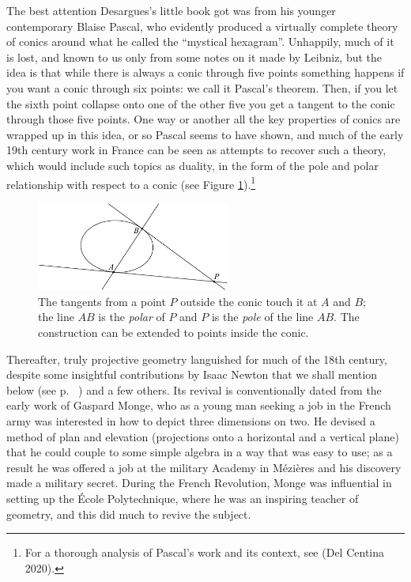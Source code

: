 The best attention Desargues's little book got was from his younger contemporary Blaise Pascal, who evidently produced a virtually complete theory of conics around what he called the ``mystical hexagram''. Unhappily, much of it is lost, and known to us only from some notes on it made by Leibniz, but the idea is that while there is always a conic through five points something happens if you want a conic through six points: we call it Pascal's theorem. Then, if you let the sixth point collapse onto one of the other five you get a tangent to the conic through those five points. One way or another all the key properties of conics are wrapped up in this idea, or so Pascal seems to have shown, and much of the early 19th century work in France can be seen as attempts to recover such a theory, which would include such topics as duality, in the form of the pole and polar relationship with respect to a conic (see Figure \ref{figpolepolar}).\footnote{For a thorough analysis of Pascal's work and its context, see (Del Centina 2020).} 



\begin{figure}
\includegraphics[width=180pt]{main/poleandpolar} 
\caption{The tangents from a point $P$ outside the conic touch it at
  $A$ and $B$; the line $AB$ is the \emph{polar} of $P$ and $P$ is the
  \emph{pole} of the line $AB$. The construction can be extended to
  points inside the conic.} 
      \label{figpolepolar}
\end{figure}

Thereafter, truly projective geometry languished for much of the 18th century, despite some insightful contributions by Isaac Newton that we shall mention below (see p. ~\pageref{Newtonconics}) and a few others. Its revival is conventionally dated from the early work of Gaspard Monge, who as a young man seeking a job in the French army was  interested in how to depict three dimensions on two. He devised a method of plan and elevation (projections onto a horizontal and a vertical plane) that he could couple to some simple algebra in a way that was easy to use; as a result he was offered a job at the military Academy in M\'ezi\`eres and his discovery made a military secret. During the French Revolution, Monge was influential in setting up the \'Ecole Polytechnique, where he was an inspiring teacher of geometry, and this did much to revive the subject. 

